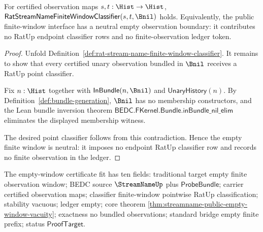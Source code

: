 \begin{theorem}
\label{thm:streamname-public-empty-window-vacuity}
For certified observation maps $s,t:\Hist\to\Hist$,
$\mathsf{RatStreamNameFiniteWindowClassifier}(s,t,\Bnil)$ holds.
Equivalently, the public finite-window interface has a neutral empty
observation boundary: it contributes no RatUp endpoint classifier rows and no
finite-observation ledger token.
\end{theorem}

\begin{proof}
Unfold
Definition~\ref{def:rat-stream-name-finite-window-classifier}.  It remains to
show that every certified unary observation bundled in $\Bnil$ receives a
RatUp point classifier.

Fix $n:\Hist$ together with
$\mathsf{InBundle}(n,\Bnil)$ and $\mathsf{UnaryHistory}(n)$.  By
Definition~\ref{def:bundle-generation}, $\Bnil$ has no membership
constructors, and the Lean bundle inversion theorem
$\mathsf{BEDC.FKernel.Bundle.inBundle\_nil\_elim}$ eliminates the displayed
membership witness.

The desired point classifier follows from this contradiction.  Hence the
empty finite window is neutral: it imposes no endpoint RatUp classifier row and
records no finite observation in the ledger.
\end{proof}

The empty-window certificate fit has ten fields: traditional target empty
finite observation window; BEDC source $\StreamNameUp$ plus
$\mathsf{ProbeBundle}$; carrier certified observation maps; classifier
finite-window pointwise RatUp classification; stability vacuous; ledger empty;
core theorem
\autoref{thm:streamname-public-empty-window-vacuity}; exactness no bundled
observations; standard bridge empty finite prefix; status
$\mathsf{ProofTarget}$.

